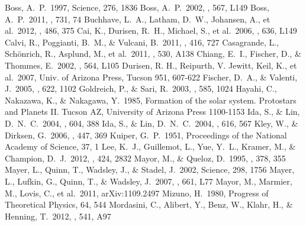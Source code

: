 \documentclass[twocolumn, dvipdfmx]{aastex62}
\begin{document}
\begin{CJK*}{UTF8}{min}
\begin{thebibliography}{}
 Boss, A.~P.\ 1997, Science, 276, 1836
 Boss, A.~P.\ 2002, \apjl, 567, L149
 Boss, A.~P.\ 2011, \apj, 731, 74
 Buchhave, L.~A., Latham, D.~W., Johansen, A., et al.\ 2012, \nat, 486, 375
 Cai, K., Durisen, R.~H., Michael, S., et al.\ 2006, \apjl, 636, L149
 Calvi, R., Poggianti, B.~M., \& Vulcani, B.\ 2011, \mnras, 416, 727
 Casagrande, L., Sch{\"o}nrich, R., Asplund, M., et al.\ 2011, \aap, 530, A138
 Chiang, E.~I., Fischer, D., \& Thommes, E.\ 2002, \apjl, 564, L105
 Durisen, R. H., Reipurth, V. Jewitt, Keil, K., et al.\ 2007, Univ. of Arizona Press, Tucson 951, 607-622
 Fischer, D.~A., \& Valenti, J.\ 2005, \apj, 622, 1102
 Goldreich, P., \& Sari, R.\ 2003, \apj, 585, 1024
 Hayahi, C., Nakazawa, K., \& Nakagawa, Y.\ 1985, Formation of the solar system. Protostars and Planets II. Tucson AZ, University of Arizona Press 1100-1153
 Ida, S., \& Lin, D.~N.~C.\ 2004, \apj, 604, 388
 Ida, S., \& Lin, D.~N.~C.\ 2004, \apj, 616, 567
 Kley, W., \& Dirksen, G.\ 2006, \aap, 447, 369
 Kuiper, G.~P.\ 1951, Proceedings of the National Academy of Science, 37, 1
 Lee, K.~J., Guillemot, L., Yue, Y.~L., Kramer, M., \& Champion, D.~J.\ 2012, \mnras, 424, 2832
 Mayor, M., \& Queloz, D.\ 1995, \nat, 378, 355
 Mayer, L., Quinn, T., Wadsley, J., \& Stadel, J.\ 2002, Science, 298, 1756
 Mayer, L., Lufkin, G., Quinn, T., \& Wadsley, J.\ 2007, \apjl, 661, L77
 Mayor, M., Marmier, M., Lovis, C., et al.\ 2011, arXiv:1109.2497
 Mizuno, H.\ 1980, Progress of Theoretical Physics, 64, 544
 Mordasini, C., Alibert, Y., Benz, W., Klahr, H., \& Henning, T.\ 2012, \aap, 541, A97

\end{thebibliography}
\end{CJK*}
\end{document}

